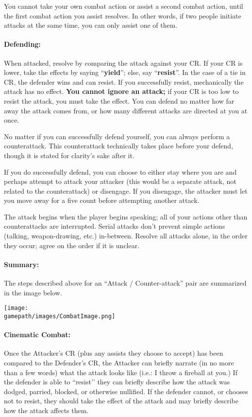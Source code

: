 \documentclass[sheet]{GL2020}
\begin{document}
You cannot take your own combat action or assist a second combat action, until the first combat action you assist resolves. In other words, if two people initiate attacks at the same time, you can only assist one of them.

\paragraph{Defending:} When attacked, resolve by comparing the attack against your CR. If your CR is lower, take the effects by saying ``\textbf{yield}''; else, say ``{\bf resist}''. In the case of a tie in CR, the defender wins and can resist. If you successfully resist, mechanically the attack has no effect. \textbf{You cannot ignore an attack;} if your CR is too low to resist the attack, you must take the effect. You can defend no matter how far away the attack comes from, or how many different attacks are directed at you at once. 

No matter if you can successfully defend yourself, you can always perform a counterattack. This counterattack technically takes place before your defend, though it is stated for clarity's sake after it. 

If you do successfully defend, you can choose to either stay where you are and perhaps attempt to attack your attacker (this would be a separate attack, not related to the counterattack) or disengage. If you disengage, the attacker must let you move away for a five count before attempting another attack. 

The attack begins when the player begins speaking; all of your actions other than counterattacks are interrupted. Serial attacks don't prevent simple actions (talking, weapon-drawing, etc.) in-between. Resolve all attacks alone, in the order they occur; agree on the order if it is unclear. 

\paragraph{Summary:} The steps described above for an ``Attack / Counter-attack” pair are summarized in the image below.
\begin{center}
\texttt{[image: \\gamepath/images/CombatImage.png]}
\end{center}

\paragraph{Cinematic Combat:} Once the Attacker's CR (plus any assists they choose to accept) has been compared to the Defender's CR, the Attacker can briefly narrate (in no more than a few words) what the attack looks like (i.e.: I throw a fireball at you.) If the defender is able to ``resist'’ they can briefly describe how the attack was dodged, parried, blocked, or otherwise nullified. If the defender cannot, or chooses not to resist, they should take the effect of the attack and may briefly describe how the attack affects them.
\end{document}
